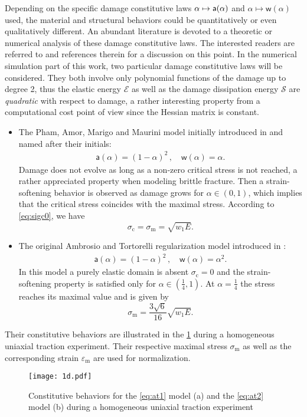 Depending on the specific damage constitutive laws $\alpha\mapsto\mathsf{a}(\alpha)$ and $\alpha\mapsto \mathsf{w}(\alpha)$ used, the material and structural behaviors could be quantitatively or even qualitatively different. An abundant literature is devoted to a theoretic or numerical analysis of these damage constitutive laws. The interested readers are referred to \cite{PhamAmorMarigoMaurini:2011,PhamMarigoMaurini:2011,LorentzCuvilliezKazymyrenko:2012,PhamMarigo:2013} and references therein for a discussion on this point. In the numerical simulation part of this work, two particular damage constitutive laws will be considered. They both involve only polynomial functions of the damage up to degree 2, thus the elastic energy $\mathcal{E}$ as well as the damage dissipation energy $\mathcal{S}$ are \emph{quadratic} with respect to damage, a rather interesting property from a computational cost point of view since the Hessian matrix is constant.
\begin{itemize}
\item The Pham, Amor, Marigo and Maurini model initially introduced in \cite{PhamAmorMarigoMaurini:2011} and named after their initials:
\begin{align} \label{eq:at1}
\mathsf{a}(\alpha)=(1-\alpha)^2\,,\quad \mathsf{w}(\alpha)=\alpha. \tag{PAMM}
\end{align}
Damage does not evolve as long as a non-zero critical stress is not reached, a rather appreciated property when modeling brittle fracture. Then a strain-softening behavior is observed as damage grows for $\alpha\in(0,1)$, which implies that the critical stress coincides with the maximal stress. According to \eqref{eq:sigc0}, we have
\[
\sigma_\mathrm{c}=\sigma_\mathrm{m}=\sqrt{w_1E}.
\]

\item The original Ambrosio and Tortorelli regularization model introduced in \cite{BourdinFrancfortMarigo:2000}:
\begin{align} \label{eq:at2}
\mathsf{a}(\alpha)=(1-\alpha)^2\,,\quad \mathsf{w}(\alpha)=\alpha^2. \tag{AT}
\end{align}
In this model a purely elastic domain is absent $\sigma_\mathrm{c}=0$ and the strain-softening property is satisfied only for $\alpha\in(\frac{1}{4},1)$. At $\alpha=\frac{1}{4}$ the stress reaches its maximal value and is given by
\[
\sigma_\mathrm{m}=\frac{3\sqrt{6}}{16}\sqrt{w_1E}.
\]
\end{itemize}

Their constitutive behaviors are illustrated in the \cref{fig:at1at2} during a homogeneous uniaxial traction experiment. Their respective maximal stress $\sigma_\mathrm{m}$ as well as the corresponding strain $\varepsilon_\mathrm{m}$ are used for normalization.
\begin{figure}[htbp]
\centering
\texttt{[image: 1d.pdf]}
\caption{Constitutive behaviors for the \eqref{eq:at1} model (a) and the \eqref{eq:at2} model (b) during a homogeneous uniaxial traction experiment} \label{fig:at1at2}
\end{figure}

